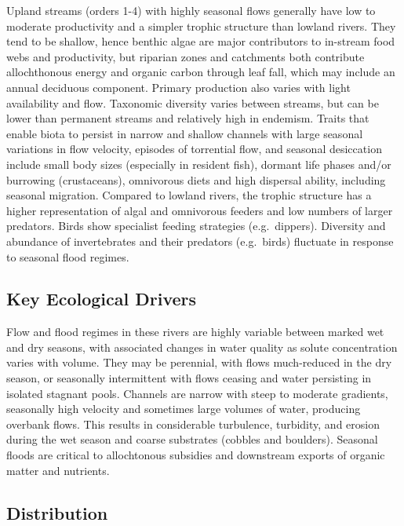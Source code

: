 \documentclass[
  letterpaper,
  DIV=11,
  numbers=noendperiod]{scrartcl}
\begin{document}
Upland streams (orders 1-4) with highly seasonal flows generally have
low to moderate productivity and a simpler trophic structure than
lowland rivers. They tend to be shallow, hence benthic algae are major
contributors to in-stream food webs and productivity, but riparian zones
and catchments both contribute allochthonous energy and organic carbon
through leaf fall, which may include an annual deciduous component.
Primary production also varies with light availability and flow.
Taxonomic diversity varies between streams, but can be lower than
permanent streams and relatively high in endemism. Traits that enable
biota to persist in narrow and shallow channels with large seasonal
variations in flow velocity, episodes of torrential flow, and seasonal
desiccation include small body sizes (especially in resident fish),
dormant life phases and/or burrowing (crustaceans), omnivorous diets and
high dispersal ability, including seasonal migration. Compared to
lowland rivers, the trophic structure has a higher representation of
algal and omnivorous feeders and low numbers of larger predators. Birds
show specialist feeding strategies (e.g.~dippers). Diversity and
abundance of invertebrates and their predators (e.g.~birds) fluctuate in
response to seasonal flood regimes.

\subsection{Key Ecological Drivers}\label{key-ecological-drivers-112}

Flow and flood regimes in these rivers are highly variable between
marked wet and dry seasons, with associated changes in water quality as
solute concentration varies with volume. They may be perennial, with
flows much-reduced in the dry season, or seasonally intermittent with
flows ceasing and water persisting in isolated stagnant pools. Channels
are narrow with steep to moderate gradients, seasonally high velocity
and sometimes large volumes of water, producing overbank flows. This
results in considerable turbulence, turbidity, and erosion during the
wet season and coarse substrates (cobbles and boulders). Seasonal floods
are critical to allochtonous subsidies and downstream exports of organic
matter and nutrients.

\subsection{Distribution}\label{distribution-112}
\end{document}
